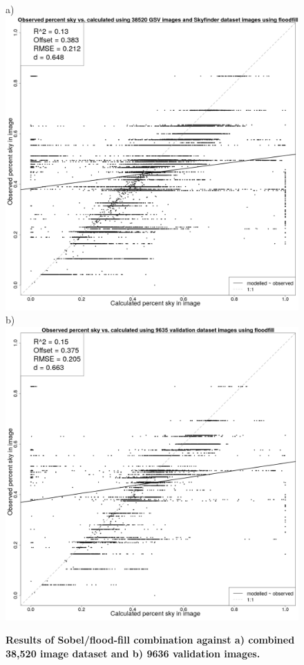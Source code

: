 \documentclass[final,3p,times,authoryear]{elsarticle}
\begin{document}
\begin{figure}
\centering
a)\includegraphics[scale=0.15]{Images/ErrorPlots2FloodfillAll.png}
b)\includegraphics[scale=0.15]{Images/ErrorPlots2FloodfillValidation.png}
\caption{\textbf{Results of Sobel/flood-fill combination against a) combined 38,520 image dataset and b) 9636 validation images.}}
\label{fig:errorfloodall}
\end{figure}
\end{document}
